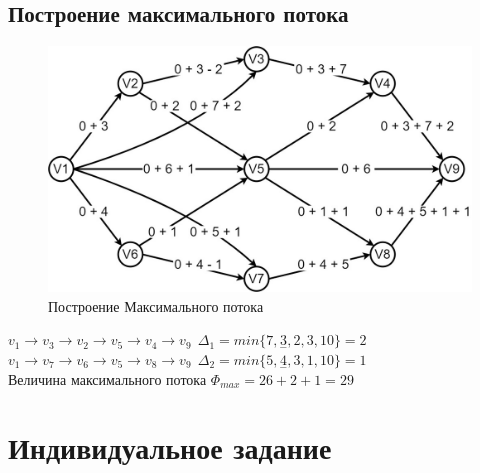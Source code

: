 \subsection{Построение максимального потока}
\begin{figure}[!htb]
\centering
\includegraphics[width=\linewidth]{Images/graph15.jpg}
\caption{Построение Максимального потока}
\label{fig:image9}
\end{figure}
\newpage
\noindent$v_1 \to v_3 \to v_2 \to v_5 \to v_4
\to v_9 \ \ \Delta_1 =
min\{7,\underset{-}{3},2,3,10\}=2$ \\
$v_1 \to v_7 \to v_6 \to v_5 \to v_8
\to v_9 \ \ \Delta_2 =
min\{5,\underset{-}{4},3,1,10\}=1$ \\
Величина максимального потока $\Phi_{max} = 26 + 2 + 1 = 29$
\newpage
\section{Индивидуальное задание}
